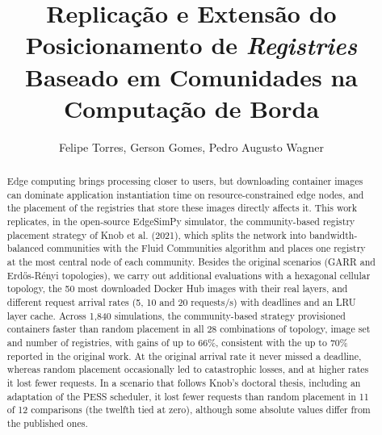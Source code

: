 \documentclass[12pt]{article}
\title{Replicação e Extensão do Posicionamento de \textit{Registries}\\ Baseado em Comunidades na Computação de Borda}
\author{Felipe Torres, Gerson Gomes, Pedro Augusto Wagner\inst{1}}
\begin{document}
\maketitle

\begin{abstract}
  Edge computing brings processing closer to users, but downloading container
  images can dominate application instantiation time on resource-constrained
  edge nodes, and the placement of the registries that store these images
  directly affects it. This work replicates, in the open-source EdgeSimPy
  simulator, the community-based registry placement strategy of Knob et al.
  (2021), which splits the network into bandwidth-balanced communities with the
  Fluid Communities algorithm and places one registry at the most central node
  of each community. Besides the original scenarios (GARR and Erdős-Rényi
  topologies), we carry out additional evaluations with a hexagonal cellular
  topology, the 50 most downloaded Docker Hub images with their real layers, and
  different request arrival rates (5, 10 and 20 requests/s) with deadlines and
  an LRU layer cache. Across 1,840 simulations, the community-based strategy
  provisioned containers faster than random placement in all 28 combinations of
  topology, image set and number of registries, with gains of up to 66\%,
  consistent with the up to 70\% reported in the original work. At the original
  arrival rate it never missed a deadline, whereas random placement occasionally
  led to catastrophic losses, and at higher rates it lost fewer requests. In a
  scenario that follows Knob's doctoral thesis, including an adaptation of the
  PESS scheduler, it lost fewer requests than random placement in 11 of 12
  comparisons (the twelfth tied at zero), although some absolute values differ
  from the published ones.
\end{abstract}
\end{document}
